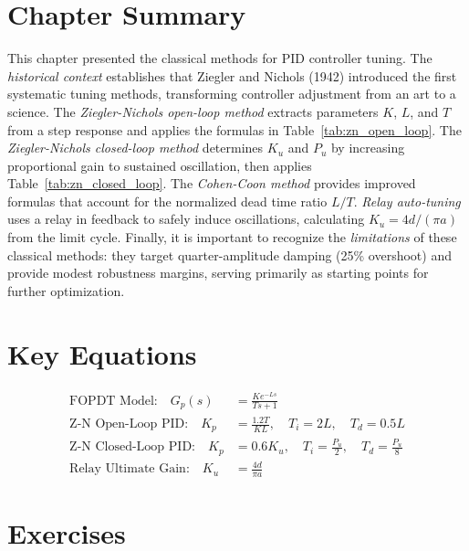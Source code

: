 \section{Chapter Summary}

This chapter presented the classical methods for PID controller tuning. The \textit{historical context} establishes that Ziegler and Nichols (1942) introduced the first systematic tuning methods, transforming controller adjustment from an art to a science. The \textit{Ziegler-Nichols open-loop method} extracts parameters $K$, $L$, and $T$ from a step response and applies the formulas in Table~\ref{tab:zn_open_loop}. The \textit{Ziegler-Nichols closed-loop method} determines $K_u$ and $P_u$ by increasing proportional gain to sustained oscillation, then applies Table~\ref{tab:zn_closed_loop}. The \textit{Cohen-Coon method} provides improved formulas that account for the normalized dead time ratio $L/T$. \textit{Relay auto-tuning} uses a relay in feedback to safely induce oscillations, calculating $K_u = 4d/(\pi a)$ from the limit cycle. Finally, it is important to recognize the \textit{limitations} of these classical methods: they target quarter-amplitude damping (25\% overshoot) and provide modest robustness margins, serving primarily as starting points for further optimization.

\section*{Key Equations}

\begin{align}
    \text{FOPDT Model:} \quad G_p(s) &= \frac{K e^{-Ls}}{Ts + 1} \\[1ex]
    \text{Z-N Open-Loop PID:} \quad K_p &= \frac{1.2T}{KL}, \quad T_i = 2L, \quad T_d = 0.5L \\[1ex]
    \text{Z-N Closed-Loop PID:} \quad K_p &= 0.6K_u, \quad T_i = \frac{P_u}{2}, \quad T_d = \frac{P_u}{8} \\[1ex]
    \text{Relay Ultimate Gain:} \quad K_u &= \frac{4d}{\pi a}
\end{align}

\newpage
\section{Exercises}

